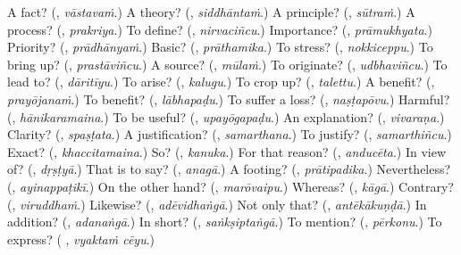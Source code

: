 \begin{tcolorbox}[breakable,colback=teal!4,colframe=teal!35!black,title={Before you move on}]
A fact? (\textbf{}, \emph{vāstavaṁ}.) A theory? (\textbf{}, \emph{siddhāntaṁ}.) A principle? (\textbf{}, \emph{sūtraṁ}.) A process? (\textbf{}, \emph{prakriya}.) To define? (\textbf{}, \emph{nirvaciñcu}.) Importance? (\textbf{}, \emph{prāmukhyata}.) Priority? (\textbf{}, \emph{prādhānyaṁ}.) Basic? (\textbf{}, \emph{prāthamika}.) To stress? (\textbf{}, \emph{nokkiceppu}.) To bring up? (\textbf{}, \emph{prastāviñcu}.) A source? (\textbf{}, \emph{mūlaṁ}.) To originate? (\textbf{}, \emph{udbhaviñcu}.) To lead to? (\textbf{}, \emph{dāritīyu}.) To arise? (\textbf{}, \emph{kalugu}.) To crop up? (\textbf{}, \emph{talettu}.) A benefit? (\textbf{}, \emph{prayōjanaṁ}.) To benefit? (\textbf{}, \emph{lābhapaḍu}.) To suffer a loss? (\textbf{}, \emph{naṣṭapōvu}.) Harmful? (\textbf{}, \emph{hānikaramaina}.) To be useful? (\textbf{}, \emph{upayōgapaḍu}.) An explanation? (\textbf{}, \emph{vivaraṇa}.) Clarity? (\textbf{}, \emph{spaṣṭata}.) A justification? (\textbf{}, \emph{samarthana}.) To justify? (\textbf{}, \emph{samarthiñcu}.) Exact? (\textbf{}, \emph{khaccitamaina}.) So? (\textbf{}, \emph{kanuka}.) For that reason? (\textbf{}, \emph{anducēta}.) In view of? (\textbf{}, \emph{dṛṣṭyā}.) That is to say? (\textbf{}, \emph{anagā}.) A footing? (\textbf{}, \emph{prātipadika}.) Nevertheless? (\textbf{}, \emph{ayinappaṭikī}.) On the other hand? (\textbf{}, \emph{marōvaipu}.) Whereas? (\textbf{}, \emph{kāgā}.) Contrary? (\textbf{}, \emph{viruddhaṁ}.) Likewise? (\textbf{}, \emph{adēvidhaṅgā}.) Not only that? (\textbf{}, \emph{antēkākuṇḍā}.) In addition? (\textbf{}, \emph{adanaṅgā}.) In short? (\textbf{}, \emph{saṅkṣiptaṅgā}.) To mention? (\textbf{}, \emph{pērkonu}.) To express? (\textbf{ }, \emph{vyaktaṁ cēyu}.)
\end{tcolorbox}
